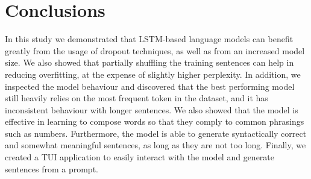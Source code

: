 \section{Conclusions}
In this study we demonstrated that LSTM-based language models can benefit greatly from the usage of dropout techniques, as well as from an increased model size. We also showed that partially shuffling the training sentences can help in reducing overfitting, at the expense of slightly higher perplexity. In addition, we inspected the model behaviour and discovered that the best performing model still heavily relies on the most frequent token in the dataset, and it has inconsistent behaviour with longer sentences. We also showed that the model is effective in learning to compose words so that they comply to common phrasings such as numbers. Furthermore, the model is able to generate syntactically correct and somewhat meaningful sentences, as long as they are not too long. Finally, we created a TUI application to easily interact with the model and generate sentences from a prompt.